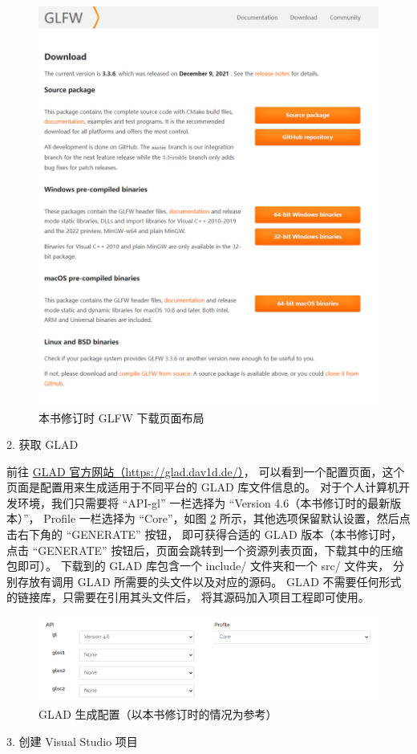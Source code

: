 \documentclass[fontset=windows]{ctexart}
\begin{document}
\begin{figure}[htbp]
    \centering
    \includegraphics[width = 0.5\linewidth]{imgs/sec 2.2/glfw-download-page.png}
    \centering
    \caption{本书修订时 GLFW 下载页面布局}
    \label{fig-gl:glfw-download-page}
\end{figure}


2. 获取 GLAD

前往 \href{https://glad.dav1d.de/}{GLAD 官方网站（https://glad.dav1d.de/）}，
可以看到一个配置页面，这个页面是配置用来生成适用于不同平台的 GLAD 库文件信息的。
对于个人计算机开发环境，我们只需要将 “API-gl” 一栏选择为 “Version 4.6（本书修订时的最新版本）”，
Profile 一栏选择为 “Core”，如图 \ref{fig-gl:glad-generate-settings} 所示，其他选项保留默认设置，然后点击右下角的 “GENERATE” 按钮，
即可获得合适的 GLAD 版本（本书修订时，点击 “GENERATE” 按钮后，页面会跳转到一个资源列表页面，下载其中的压缩包即可）。
下载到的 GLAD 库包含一个 include/ 文件夹和一个 src/ 文件夹，
分别存放有调用 GLAD 所需要的头文件以及对应的源码。
GLAD 不需要任何形式的链接库，只需要在引用其头文件后，
将其源码加入项目工程即可使用。

\begin{figure}[htbp]
    \centering
    \includegraphics[width = 0.7\linewidth]{imgs/sec 2.2/glad-generate-settings.png}
    \centering
    \caption{GLAD 生成配置（以本书修订时的情况为参考）}
    \label{fig-gl:glad-generate-settings}
\end{figure}

3. 创建 Visual Studio 项目
\end{document}
